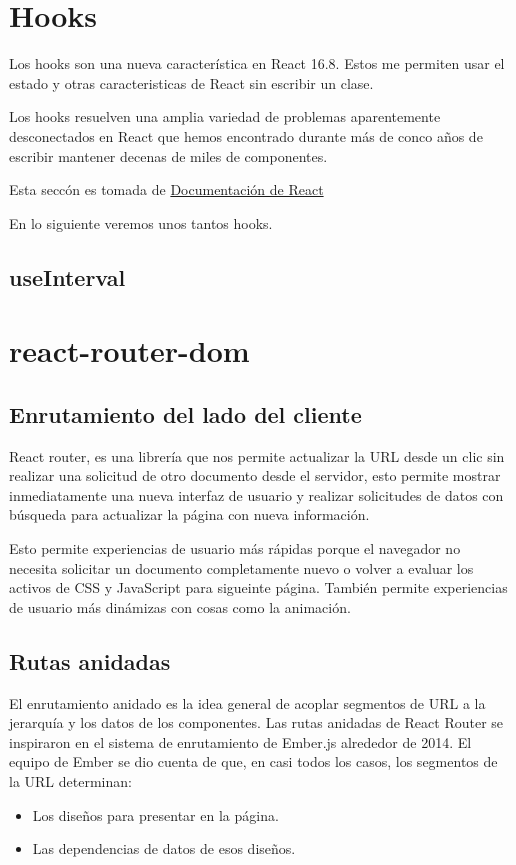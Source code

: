 \section{Hooks}
Los hooks son una nueva caracter\'istica en React 16.8. Estos me permiten usar el estado y otras caracteristicas de React sin escribir un clase.

Los hooks resuelven una amplia variedad de problemas aparentemente desconectados en React que hemos encontrado durante m\'as de conco a\~nos de escribir
mantener decenas de miles de componentes.

Esta secc\'on es tomada de \href{https://es.reactjs.org/docs/hooks-intro.html}{\blue Documentaci\'on de React}

En lo siguiente veremos unos tantos hooks.




\subsection{useInterval}


\section{react-router-dom}

\subsection{Enrutamiento del lado del cliente}

React router, es una librería que nos permite actualizar la URL desde un clic sin realizar una solicitud
de otro documento desde el servidor, esto permite mostrar inmediatamente una nueva interfaz de usuario y realizar solicitudes
de datos con b\'usqueda para actualizar la p\'agina con nueva informaci\'on.

Esto permite experiencias de usuario m\'as r\'apidas porque el navegador no necesita solicitar un documento
completamente nuevo o volver a evaluar los activos de CSS y JavaScript para sigueinte p\'agina. Tambi\'en permite experiencias de usuario m\'as din\'amizas
con cosas como la animaci\'on.

\subsection{Rutas anidadas}
El enrutamiento anidado es la idea general de acoplar segmentos de URL a la jerarqu\'ia y los datos de los componentes. Las rutas anidadas de React
Router se inspiraron en el sistema de enrutamiento de Ember.js alrededor de 2014. El equipo de Ember se dio cuenta de que, en casi todos los casos, los segmentos de la URL determinan:
\begin{itemize}
  \item Los dise\~nos para presentar en la p\'agina.
  \item Las dependencias de datos de esos dise\~nos.
\end{itemize}

